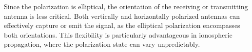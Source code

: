 Since the polarization is elliptical, the orientation of the receiving or transmitting antenna is less critical. Both vertically and horizontally polarized antennas can effectively capture or emit the signal, as the elliptical polarization encompasses both orientations. This flexibility is particularly advantageous in ionospheric propagation, where the polarization state can vary unpredictably.


